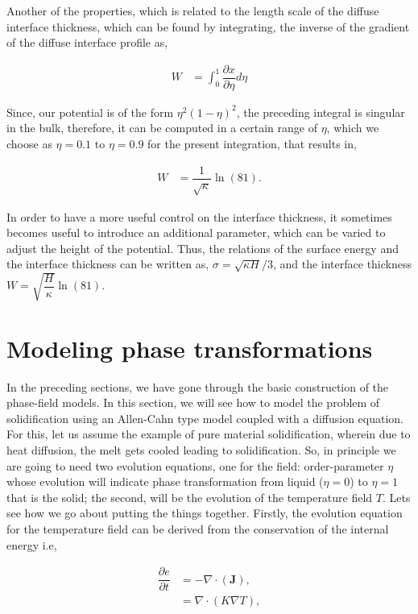 \documentclass[english]{iambook}
\begin{document}
Another of the properties, which is related to the length scale of
the diffuse interface thickness, which can be found by integrating, 
the inverse of the gradient of the diffuse interface profile as, 

\begin{align}
 W &= \int_{0}^{1}\dfrac{\partial x}{\partial \eta} d\eta
\end{align}

Since, our potential is of the form $\eta^{2}\left(1-\eta\right)^{2}$, 
the preceding integral is singular in the bulk, therefore, it can 
be computed in a certain range of $\eta$, which we choose as 
$\eta=0.1$ to $\eta=0.9$ for the present integration, that 
results in,

\begin{align}
 W &= \dfrac{1}{\sqrt\kappa} \ln\left(81\right).
\end{align}

In order to have a more useful control on the interface thickness,
it sometimes becomes useful to introduce an additional parameter, 
which can be varied to adjust the height of the potential. Thus, 
the relations of the surface energy and the interface thickness
can be written as, $\sigma = \sqrt{\kappa H}/3$, and the 
interface thickness $W=\sqrt{\dfrac{H}{\kappa}}\ln\left(81\right)$.

\section{Modeling phase transformations}
In the preceding sections, we have gone through
the basic construction of the phase-field models. In this section, 
we will see how to model the problem of solidification using
an Allen-Cahn type model coupled with a diffusion equation. 
For this, let us assume the example of pure material solidification, 
wherein due to heat diffusion, the melt gets cooled
leading to solidification. So, in principle we are going to 
need two evolution equations, one for the field: order-parameter
$\eta$ whose evolution will indicate phase transformation from 
liquid ($\eta=0$) to $\eta=1$ that is the solid; the second, 
will be the evolution of the temperature field $T$. Lets 
see how we go about putting the things together. Firstly, 
the evolution equation for the temperature field can be 
derived from the conservation of the internal energy i.e,

\begin{align}
 \dfrac{\partial e}{\partial t} &= -\nabla\cdot\left(\mathbf{J}\right),\\
                                &=  \nabla\cdot\left(K\nabla T\right),
                                \label{Temperature_evolution}
\end{align}
\end{document}
